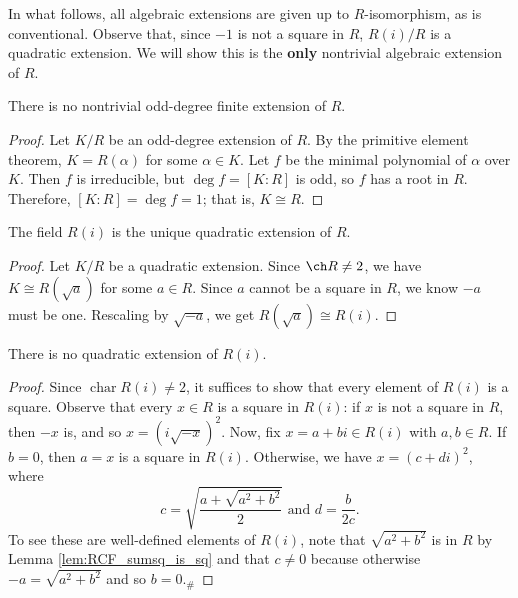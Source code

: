 In what follows, all algebraic extensions are given up to $R$-isomorphism, as is conventional. Observe that, since $-1$ is not a square in $R$, $R(i)/R$ is a quadratic extension. We will show this is the \textbf{only} nontrivial algebraic extension of $R$.

\begin{lemma}
  \label{lem:alg_ext_odd_deg}
  There is no nontrivial odd-degree finite extension of $R$.
\end{lemma}
\begin{proof}
  Let $K/R$ be an odd-degree extension of $R$. By the primitive element theorem, $K=R(\alpha)$ for some $\alpha\in K$. Let $f$ be the minimal polynomial of $\alpha$ over $K$. Then $f$ is irreducible, but $\deg f=[K:R]$ is odd, so $f$ has a root in $R$. Therefore, $[K:R]=\deg f=1$; that is, $K\cong R$.
\end{proof}

\begin{lemma}
  \label{lem:ext_deg_2}
  The field $R(i)$ is the unique quadratic extension of $R$.
\end{lemma}
\begin{proof}
  Let $K/R$ be a quadratic extension. Since $\ch R\neq2$, we have $K\cong R(\sqrt{a})$ for some $a\in R$. Since $a$ cannot be a square in $R$, we know $-a$ must be one. Rescaling by $\sqrt{-a}$, we get $R(\sqrt{a})\cong R(i)$.
\end{proof}

\begin{lemma}
  \label{lem:Ri_ext_deg_2}
  There is no quadratic extension of $R(i)$.
\end{lemma}
\begin{proof}
  Since $\operatorname{char}R(i)\neq 2$, it suffices to show that every element of $R(i)$ is a square. Observe that every $x\in R$ is a square in $R(i)$: if $x$ is not a square in $R$, then $-x$ is, and so $x=(i\sqrt{-x})^2$. Now, fix $x=a+bi\in R(i)$ with $a,b\in R$. If $b=0$, then $a=x$ is a square in $R(i)$. Otherwise, we have $x=(c+di)^2$, where
  \[c=\sqrt{\frac{a+\sqrt{a^2+b^2}}{2}}\text{ and }d=\frac{b}{2c}.\]
  To see these are well-defined elements of $R(i)$, note that $\sqrt{a^2+b^2}$ is in $R$ by Lemma \ref{lem:RCF_sumsq_is_sq} and that $c\neq0$ because otherwise $-a=\sqrt{a^2+b^2}$ and so $b=0$.$_\#$
\end{proof}

